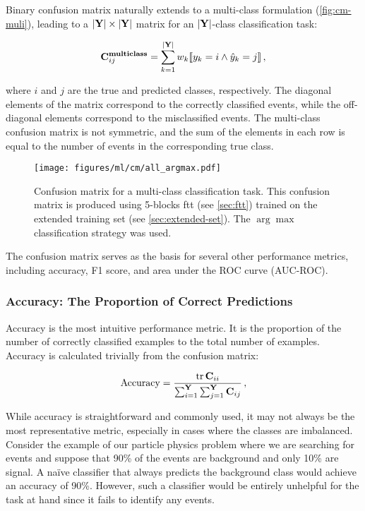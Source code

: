Binary confusion matrix naturally extends to a multi-class formulation (\autoref{fig:cm-muli}), leading to a
$|\textbf{Y}| \times |\textbf{Y}|$ matrix for an $|\textbf{Y}|$-class classification task:

\begin{equation}
    \mathbf{C}^{\textbf{multiclass}}_{ij} = \sum_{k=1}^{|\textbf{Y}|} w_k \llbracket y_k = i \land \hat{y}_k = j \rrbracket\,,
\end{equation}

where $i$ and $j$ are the true and predicted classes, respectively. The diagonal elements of the matrix correspond to
the correctly classified events, while the off-diagonal elements correspond to the misclassified events. The
multi-class confusion matrix is not symmetric, and the sum of the elements in each row is equal to the number of events
in the corresponding true class.

\begin{figure}[htb]
    \centering
    \texttt{[image: figures/ml/cm/all\_argmax.pdf]}
    \caption[Confusion matrix for a multi-class classification task]
    {Confusion matrix for a multi-class classification task. This confusion matrix is produced using 5-blocks
        \gls{ftt} (see \autoref{sec:ftt}) trained on the extended training set (see \autoref{sec:extended-set}). The
        $\arg\max$ classification strategy was used.}
    \label{fig:cm-muli}
\end{figure}

The confusion matrix serves as the basis for several other performance metrics, including accuracy, F1 score, and area
under the ROC curve (AUC-ROC).

\subsubsection{Accuracy: The Proportion of Correct Predictions}

Accuracy is the most intuitive performance metric. It is the proportion of the number of correctly classified examples
to the total number of examples. Accuracy is calculated trivially from the confusion matrix:

\begin{align}
    \acc  = \frac{\trace \C_{ii}}{\sum_{i=1}^\classY \sum_{j=1}^\classY \C_{ij}}\,,
\end{align}

While accuracy is straightforward and commonly used, it may not always be the most representative metric, especially in
cases where the classes are imbalanced. Consider the example of our particle physics problem where we are searching for
\tth events and suppose that 90\% of the events are background and only 10\% are signal. A naïve classifier that
always predicts the background class would achieve an accuracy of 90\%. However, such a classifier would be entirely
unhelpful for the task at hand since it fails to identify any \tth events.

